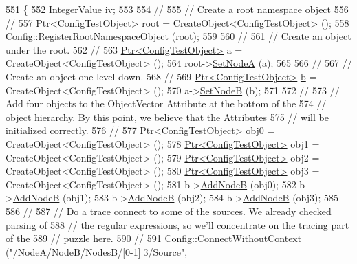 \begin{DoxyCode}
551 \{
552   IntegerValue iv;
553 
554   \textcolor{comment}{//}
555   \textcolor{comment}{// Create a root namespace object}
556   \textcolor{comment}{//}
557   \hyperlink{classns3_1_1Ptr}{Ptr<ConfigTestObject>} root = CreateObject<ConfigTestObject> ();
558   \hyperlink{group__config_gadf663c596f54bed678e83cccd4e3d9d5}{Config::RegisterRootNamespaceObject} (root);
559 
560   \textcolor{comment}{//}
561   \textcolor{comment}{// Create an object under the root.}
562   \textcolor{comment}{//}
563   \hyperlink{classns3_1_1Ptr}{Ptr<ConfigTestObject>} a = CreateObject<ConfigTestObject> ();
564   root->\hyperlink{classConfigTestObject_aa1f3fc0f4e345021d93d6f3704eae58a}{SetNodeA} (a);
565 
566   \textcolor{comment}{//}
567   \textcolor{comment}{// Create an object one level down.}
568   \textcolor{comment}{//}
569   \hyperlink{classns3_1_1Ptr}{Ptr<ConfigTestObject>} \hyperlink{buildings__pathloss_8m_a21ad0bd836b90d08f4cf640b4c298e7c}{b} = CreateObject<ConfigTestObject> ();
570   a->\hyperlink{classConfigTestObject_a4bbf3c248c741e2f0840c3db3a88ad5c}{SetNodeB} (b);
571 
572   \textcolor{comment}{//}
573   \textcolor{comment}{// Add four objects to the ObjectVector Attribute at the bottom of the }
574   \textcolor{comment}{// object hierarchy.  By this point, we believe that the Attributes}
575   \textcolor{comment}{// will be initialized correctly.}
576   \textcolor{comment}{//}
577   \hyperlink{classns3_1_1Ptr}{Ptr<ConfigTestObject>} obj0 = CreateObject<ConfigTestObject> ();
578   \hyperlink{classns3_1_1Ptr}{Ptr<ConfigTestObject>} obj1 = CreateObject<ConfigTestObject> ();
579   \hyperlink{classns3_1_1Ptr}{Ptr<ConfigTestObject>} obj2 = CreateObject<ConfigTestObject> ();
580   \hyperlink{classns3_1_1Ptr}{Ptr<ConfigTestObject>} obj3 = CreateObject<ConfigTestObject> ();
581   b->\hyperlink{classConfigTestObject_a288533076f98c4ef77ca2181294b0f32}{AddNodeB} (obj0);
582   b->\hyperlink{classConfigTestObject_a288533076f98c4ef77ca2181294b0f32}{AddNodeB} (obj1);
583   b->\hyperlink{classConfigTestObject_a288533076f98c4ef77ca2181294b0f32}{AddNodeB} (obj2);
584   b->\hyperlink{classConfigTestObject_a288533076f98c4ef77ca2181294b0f32}{AddNodeB} (obj3);
585 
586   \textcolor{comment}{//}
587   \textcolor{comment}{// Do a trace connect to some of the sources.  We already checked parsing of}
588   \textcolor{comment}{// the regular expressions, so we'll concentrate on the tracing part of the }
589   \textcolor{comment}{// puzzle here.}
590   \textcolor{comment}{//}
591   \hyperlink{group__config_gaa2f896aa7021f95fffabc80b2ec22e08}{Config::ConnectWithoutContext} (\textcolor{stringliteral}{"/NodeA/NodeB/NodesB/[0-1]|3/Source"}, 

\end{DoxyCode}
